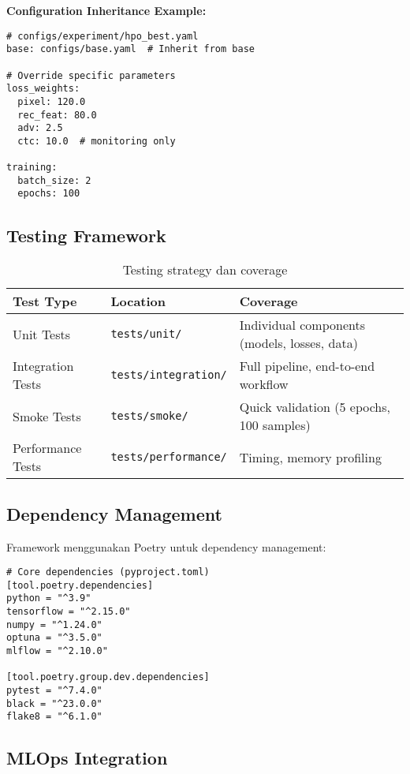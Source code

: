 \documentclass[12pt,a4paper]{article}
\begin{document}
\textbf{Configuration Inheritance Example:}
\begin{verbatim}
# configs/experiment/hpo_best.yaml
base: configs/base.yaml  # Inherit from base

# Override specific parameters
loss_weights:
  pixel: 120.0
  rec_feat: 80.0
  adv: 2.5
  ctc: 10.0  # monitoring only

training:
  batch_size: 2
  epochs: 100
\end{verbatim}

\subsection{Testing Framework}

\begin{table}[H]
\centering
\caption{Testing strategy dan coverage}
\label{tab:appendix-testing}
\small
\begin{tabular}{|l|l|p{7cm}|}
\hline
\textbf{Test Type} & \textbf{Location} & \textbf{Coverage} \\ \hline
Unit Tests & \texttt{tests/unit/} & Individual components (models, losses, data) \\ \hline
Integration Tests & \texttt{tests/integration/} & Full pipeline, end-to-end workflow \\ \hline
Smoke Tests & \texttt{tests/smoke/} & Quick validation (5 epochs, 100 samples) \\ \hline
Performance Tests & \texttt{tests/performance/} & Timing, memory profiling \\ \hline
\end{tabular}
\end{table}

\subsection{Dependency Management}

Framework menggunakan Poetry untuk dependency management:

\begin{verbatim}
# Core dependencies (pyproject.toml)
[tool.poetry.dependencies]
python = "^3.9"
tensorflow = "^2.15.0"
numpy = "^1.24.0"
optuna = "^3.5.0"
mlflow = "^2.10.0"

[tool.poetry.group.dev.dependencies]
pytest = "^7.4.0"
black = "^23.0.0"
flake8 = "^6.1.0"
\end{verbatim}

\subsection{MLOps Integration}
\end{document}
